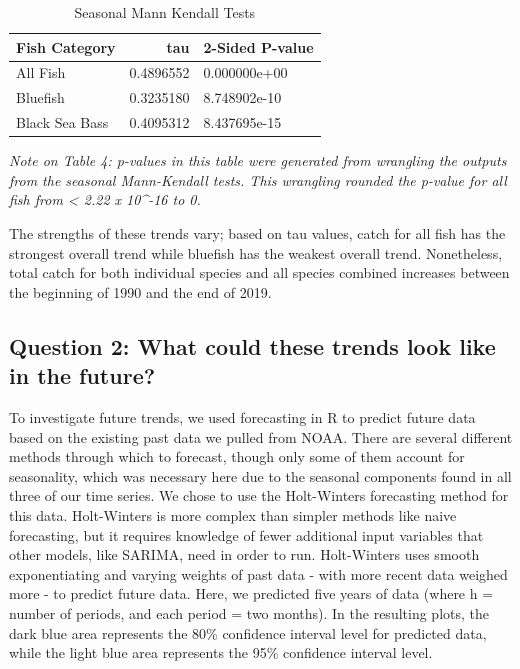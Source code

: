 \documentclass[
  12pt,
]{article}
\begin{document}
\begin{table}[H]

\caption{\label{tab:table4}Seasonal Mann Kendall Tests}
\centering
\begin{tabular}[t]{l|r|l}
\hline
Fish Category & tau & 2-Sided P-value\\
\hline
All Fish & 0.4896552 & 0.000000e+00\\
\hline
Bluefish & 0.3235180 & 8.748902e-10\\
\hline
Black Sea Bass & 0.4095312 & 8.437695e-15\\
\hline
\end{tabular}
\end{table}

\emph{Note on Table 4: p-values in this table were generated from
wrangling the outputs from the seasonal Mann-Kendall tests. This
wrangling rounded the p-value for all fish from \textless{} 2.22 x
10\^{}-16 to 0.}

The strengths of these trends vary; based on tau values, catch for all
fish has the strongest overall trend while bluefish has the weakest
overall trend. Nonetheless, total catch for both individual species and
all species combined increases between the beginning of 1990 and the end
of 2019.

\hypertarget{question-2-what-could-these-trends-look-like-in-the-future}{%
\subsection{Question 2: What could these trends look like in the
future?}\label{question-2-what-could-these-trends-look-like-in-the-future}}

To investigate future trends, we used forecasting in R to predict future
data based on the existing past data we pulled from NOAA. There are
several different methods through which to forecast, though only some of
them account for seasonality, which was necessary here due to the
seasonal components found in all three of our time series. We chose to
use the Holt-Winters forecasting method for this data. Holt-Winters is
more complex than simpler methods like naive forecasting, but it
requires knowledge of fewer additional input variables that other
models, like SARIMA, need in order to run. Holt-Winters uses smooth
exponentiating and varying weights of past data - with more recent data
weighed more - to predict future data. Here, we predicted five years of
data (where h = number of periods, and each period = two months). In the
resulting plots, the dark blue area represents the 80\% confidence
interval level for predicted data, while the light blue area represents
the 95\% confidence interval level.
\end{document}
